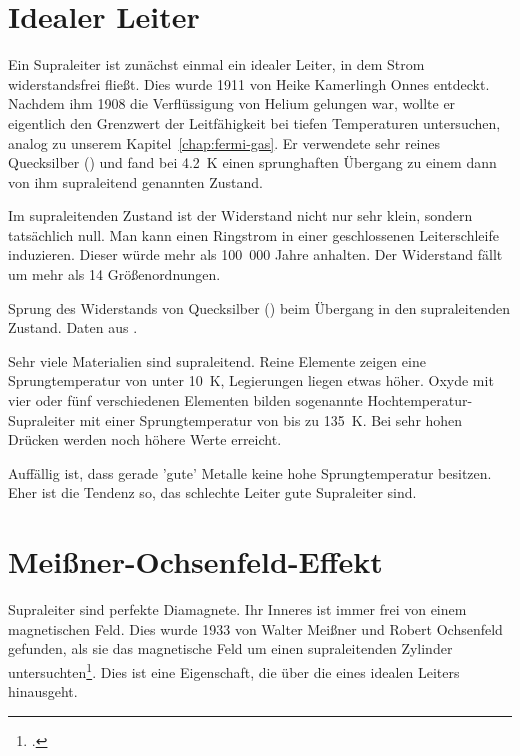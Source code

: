 \section*{Idealer Leiter}

Ein Supraleiter ist zunächst einmal ein idealer Leiter, in dem Strom widerstandsfrei fließt. Dies wurde 1911 von Heike Kamerlingh Onnes entdeckt. Nachdem ihm 1908 die Verflüssigung von Helium gelungen war, wollte er eigentlich den Grenzwert der Leitfähigkeit bei tiefen Temperaturen untersuchen, analog zu unserem Kapitel~\ref{chap:fermi-gas}. Er verwendete sehr reines Quecksilber () und fand bei 4.2~K einen sprunghaften Übergang zu einem dann von ihm supraleitend genannten Zustand.

Im supraleitenden Zustand ist der Widerstand nicht nur sehr klein, sondern tatsächlich null. Man kann einen Ringstrom in einer geschlossenen Leiterschleife induzieren. Dieser würde mehr als 100~000 Jahre anhalten. Der Widerstand fällt um mehr als 14 Größenordnungen.

\begin{marginfigure}
    \caption{Sprung des Widerstands von Quecksilber () beim Übergang in den supraleitenden Zustand. Daten aus \cite{Kamerlingh_Onnes_1911}.}
\end{marginfigure}

Sehr viele Materialien sind supraleitend. Reine Elemente zeigen eine Sprungtemperatur  von unter 10~K, Legierungen liegen etwas höher. Oxyde mit vier oder fünf verschiedenen Elementen bilden sogenannte Hochtemperatur-Supraleiter mit einer Sprungtemperatur von bis zu 135~K. Bei sehr hohen Drücken werden noch höhere Werte erreicht.

Auffällig ist, dass gerade 'gute' Metalle keine hohe Sprungtemperatur besitzen. Eher ist die Tendenz so, das schlechte Leiter gute Supraleiter sind.




\section*{Meißner-Ochsenfeld-Effekt}

Supraleiter sind perfekte Diamagnete. Ihr Inneres ist immer frei von einem magnetischen Feld. Dies wurde 1933 von Walter Meißner und Robert Ochsenfeld gefunden, als sie das magnetische Feld um einen supraleitenden Zylinder untersuchten\footcite{Meissner1933}. Dies ist eine Eigenschaft, die über die eines idealen Leiters hinausgeht. 


